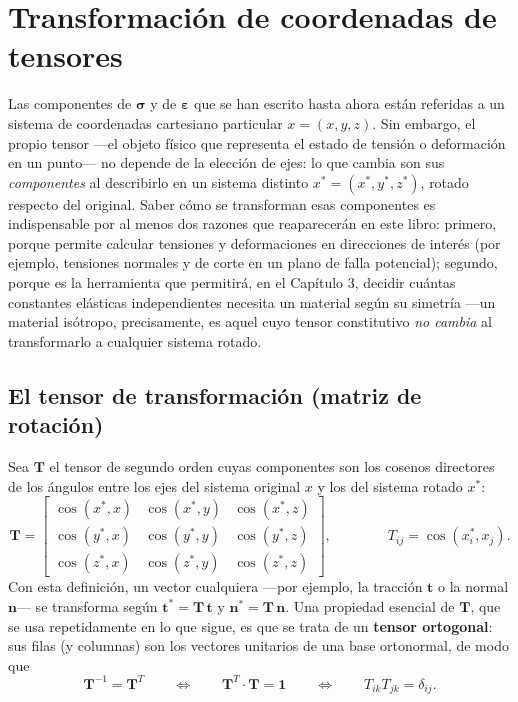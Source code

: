 \section{Transformación de coordenadas de tensores}
\label{sec:cap02-transformacion}

Las componentes de $\bm\sigma$ y de $\bm\varepsilon$ que se han escrito hasta ahora están referidas a un sistema de coordenadas cartesiano particular $x=(x,y,z)$. Sin embargo, el propio tensor —el objeto físico que representa el estado de tensión o deformación en un punto— no depende de la elección de ejes: lo que cambia son sus \emph{componentes} al describirlo en un sistema distinto $x^*=(x^*,y^*,z^*)$, rotado respecto del original. Saber cómo se transforman esas componentes es indispensable por al menos dos razones que reaparecerán en este libro: primero, porque permite calcular tensiones y deformaciones en direcciones de interés (por ejemplo, tensiones normales y de corte en un plano de falla potencial); segundo, porque es la herramienta que permitirá, en el Capítulo 3, decidir cuántas constantes elásticas independientes necesita un material según su simetría —un material isótropo, precisamente, es aquel cuyo tensor constitutivo \emph{no cambia} al transformarlo a cualquier sistema rotado.

\subsection{El tensor de transformación (matriz de rotación)}

Sea $\bm T$ el tensor de segundo orden cuyas componentes son los cosenos directores de los ángulos entre los ejes del sistema original $x$ y los del sistema rotado $x^*$:
\[
\bm T =
\begin{bmatrix}
\cos(x^*,x) & \cos(x^*,y) & \cos(x^*,z) \\
\cos(y^*,x) & \cos(y^*,y) & \cos(y^*,z) \\
\cos(z^*,x) & \cos(z^*,y) & \cos(z^*,z)
\end{bmatrix}, \qquad\qquad T_{ij} = \cos(x_i^*, x_j).
\]
Con esta definición, un vector cualquiera —por ejemplo, la tracción $\bm t$ o la normal $\bm n$— se transforma según $\bm t^* = \bm T\,\bm t$ y $\bm n^* = \bm T\,\bm n$. Una propiedad esencial de $\bm T$, que se usa repetidamente en lo que sigue, es que se trata de un \textbf{tensor ortogonal}: sus filas (y columnas) son los vectores unitarios de una base ortonormal, de modo que
\[
\bm T^{-1} = \bm T^{T} \qquad \Longleftrightarrow \qquad \bm T^{T}\cdot\bm T = \bm 1 \qquad \Longleftrightarrow \qquad T_{ik}T_{jk}=\delta_{ij}.
\]

